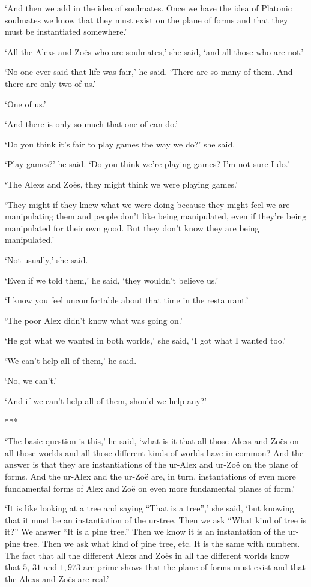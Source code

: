 `And then we add in the idea of soulmates. Once we have the {\twelveit idea\/} of Platonic soulmates we know that they must exist on the plane of forms and that they must be instantiated somewhere.'

`All the Alexs and Zo{\"e}s who are soulmates,' she said, `and all those who are not.'

`No-one ever said that life was fair,' he said. `There are so many of them. And there are only two of us.'

`One of us.'

`And there is only so much that one of can do.'

`Do you think it's fair to play games the way we do?' she said.

`Play games?' he said. `Do you think we're playing games? I'm
not sure I do.'

`The Alexs and Zo{\"e}s, they might think we were playing games.'

`They might if they knew what we were doing because they might feel we are manipulating them and people don't like being manipulated, even if they're being manipulated for their own good. But they don't know they are being manipulated.'

`Not usually,' she said.

`Even if we told them,' he said, `they wouldn't
believe us.'

`I know you feel uncomfortable about that time in the restaurant.'

`The poor Alex didn't know what was going on.'

`He got what we wanted in both worlds,' she said, `I got what I wanted too.'

`We can't help all of them,' he said.

`No, we can't.'

`And if we can't help all of them, should we help any?'

***

`The basic question is this,' he said, `what is it that all those Alexs and Zo{\"e}s on all those worlds and all those different kinds of worlds have in common? And the answer is that they are instantiations of the ur-Alex and ur-Zo{\"e} on the plane of forms. And the ur-Alex and the ur-Zo{\"e} are, in turn, instantations of even more fundamental forms of Alex and Zo{\"e} on even more fundamental planes of form.'

`It is like looking at a tree and saying ``That is a tree'',' she said, `but knowing that it must be an instantiation of the ur-tree. Then we ask ``What kind of tree is it?'' We answer ``It is a pine tree.'' Then we know it is an instantation of the ur-pine tree. Then we ask what kind of pine tree, etc. It is the same with numbers. The fact that all the different Alexs and Zo{\"e}s in all the different worlds {\twelveit know\/} that $5$, $31$ and $1,973$ are prime shows that the plane of forms must exist and that the Alexs and Zo{\"e}s are real.'

